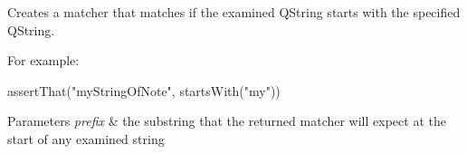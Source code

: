 Creates a matcher that matches if the examined {\ttfamily Q\-String} starts with the specified {\ttfamily Q\-String}. 

For example\-: 
\begin{DoxyPre}assertThat("myStringOfNote", startsWith("my"))\end{DoxyPre}



\begin{DoxyParams}{Parameters}
{\em prefix} & the substring that the returned matcher will expect at the start of any examined string \\
\hline
\end{DoxyParams}
